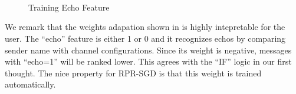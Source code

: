 \documentclass{sig-alternate}
\begin{document}
\begin{figure}
	\centering
	\\%
	\\%
	\\%
	\caption{Training Echo Feature}
	\label{fig:echo_train}
\end{figure}

%
%



We remark that the weights adapation shown in \rfig{\ref{fig:echo_train}}
is highly intepretable for the user. 
The ``echo'' feature is either 1 or 0 
and it recognizes echos by comparing sender name with channel configurations. 
Since its weight is negative, 
messages with ``echo=1'' will be ranked lower. 
This agrees with the ``IF'' logic in our first thought. 
The nice property for RPR-SGD is that this weight is trained automatically.  
\end{document}
